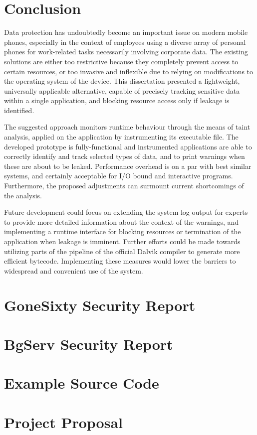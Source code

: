 \documentclass[12pt,twoside,notitlepage]{report}
\begin{document}
\cleardoublepage
\chapter{Conclusion}

Data protection has undoubtedly become an important issue on modern mobile phones, especially in the context of employees using a diverse array of personal phones for work-related tasks necessarily involving corporate data. The existing solutions are either too restrictive because they completely prevent access to certain resources, or too invasive and inflexible due to relying on modifications to the operating system of the device. This dissertation presented a lightweight, universally applicable alternative, capable of precisely tracking sensitive data within a single application, and blocking resource access only if leakage is identified.

The suggested approach monitors runtime behaviour through the means of taint analysis, applied on the application by instrumenting its executable file. The developed prototype is fully-functional and instrumented applications are able to correctly identify and track selected types of data, and to print warnings when these are about to be leaked. Performance overhead is on a par with best similar systems, and certainly acceptable for I/O bound and interactive programs. Furthermore, the proposed adjustments can surmount current shortcomings of the analysis.

Future development could focus on extending the system log output for experts to provide more detailed information about the context of the warnings, and implementing a runtime interface for blocking resources or termination of the application when leakage is imminent. Further efforts could be made towards utilizing parts of the pipeline of the official Dalvik compiler to generate more efficient bytecode. Implementing these measures would lower the barriers to widespread and convenient use of the system.

\cleardoublepage



\cleardoublepage

\appendix

\chapter{GoneSixty Security Report}
\label{chapter:Report_Gone60}

\cleardoublepage

\chapter{BgServ Security Report}
\label{chapter:Report_BgServ}

\cleardoublepage

\chapter{Example Source Code}

\cleardoublepage

\chapter{Project Proposal}


\end{document}
